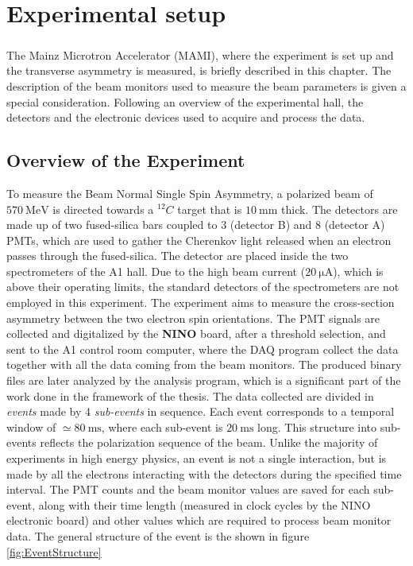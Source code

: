 \chapter{Experimental setup} 

\paragraph{} The Mainz Microtron Accelerator (MAMI), where the experiment is set up and the transverse asymmetry is measured, is briefly described in this chapter.  The description of the beam monitors used to measure the beam parameters is given a special consideration. Following an overview of the experimental hall, the detectors and the electronic devices used to acquire and process the data. 

\section{Overview of the Experiment} \label{FirstDescription}

To measure the Beam Normal Single Spin Asymmetry, a polarized beam of $ \SI{570}{\mega \electronvolt}$ is directed towards a  $^{12}C$ target that is $\SI{10}{\milli \meter}$ thick. The detectors are made up of two fused-silica bars coupled to 3 (detector B) and 8 (detector A) PMTs, which are used to gather the Cherenkov light released when an electron passes through the fused-silica. The detector are placed inside the two spectrometers of the A1 hall. Due to the high beam current ($ \SI{20}{\micro \ampere}$), which is above their operating
limits, the standard detectors of the spectrometers are not employed in this experiment. The experiment aims to measure the cross-section asymmetry between the two electron spin orientations. The PMT signals are collected and digitalized by the \textbf{NINO} board, after a threshold selection, and sent to the A1 control room computer, where the DAQ program collect the data together with all the data coming from the beam monitors. The produced  binary files are later analyzed by the analysis program, which is a significant part of the work done in the framework of the thesis. 
The data collected are divided in \textit{events} made by 4 \textit{sub-events} in sequence. Each event corresponds to a temporal window of $\simeq \SI{80}{\milli \second}$, where each sub-event is $\SI{20}{\milli \second}$ long. This structure into sub-events reflects the polarization sequence of the beam.
Unlike the majority of experiments in high energy physics, an event is not a single interaction, but is made by all the electrons interacting with the detectors during the specified time interval. The PMT counts and the beam monitor values are saved for each sub-event, along with their time length (measured in clock cycles by the NINO electronic board) and other values which are required to process beam monitor data. The general structure of the event is the shown in figure \ref{fig:EventStructure} 

